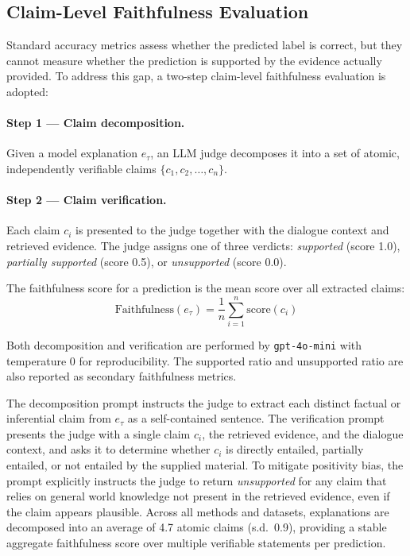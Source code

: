 \documentclass[runningheads]{llncs}
\begin{document}
\subsection{Claim-Level Faithfulness Evaluation}
\label{sec:faithfulness}

Standard accuracy metrics assess whether the predicted label is correct,
but they cannot measure whether the prediction is supported by the evidence
actually provided. To address this gap, a two-step claim-level faithfulness
evaluation is adopted:

\paragraph{Step 1 — Claim decomposition.}
Given a model explanation $e_\tau$, an LLM judge decomposes it into a
set of atomic, independently verifiable claims
$\{c_1, c_2, \ldots, c_n\}$.

\paragraph{Step 2 — Claim verification.}
Each claim $c_i$ is presented to the judge together with the dialogue
context and retrieved evidence. The judge assigns one of three verdicts:
\emph{supported} (score 1.0), \emph{partially supported} (score 0.5),
or \emph{unsupported} (score 0.0).

The faithfulness score for a prediction is the mean score over all
extracted claims:
\begin{equation}
    \text{Faithfulness}(e_\tau) = \frac{1}{n}\sum_{i=1}^{n} \text{score}(c_i)
\end{equation}

Both decomposition and verification are performed by \texttt{gpt-4o-mini}
with temperature 0 for reproducibility. The supported ratio and
unsupported ratio are also reported as secondary faithfulness metrics.

The decomposition prompt instructs the judge to extract each distinct
factual or inferential claim from $e_\tau$ as a self-contained sentence.
The verification prompt presents the judge with a single claim $c_i$,
the retrieved evidence, and the dialogue context, and asks it to
determine whether $c_i$ is directly entailed, partially entailed, or
not entailed by the supplied material. To mitigate positivity bias, the
prompt explicitly instructs the judge to return \emph{unsupported} for
any claim that relies on general world knowledge not present in the
retrieved evidence, even if the claim appears plausible. Across all
methods and datasets, explanations are decomposed into an average of
4.7 atomic claims (s.d.\ 0.9), providing a stable aggregate
faithfulness score over multiple verifiable statements per prediction.
\end{document}
